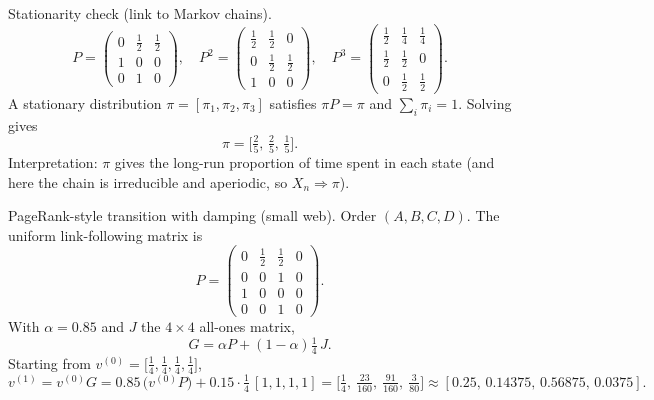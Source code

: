 \documentclass[11pt]{article}
\def\textbf#1{#1}%
\begin{document}
\begin{solution}
\textbf{Stationarity check (link to Markov chains).}
\[
P=\begin{pmatrix}
0&\tfrac12&\tfrac12\\
1&0&0\\
0&1&0
\end{pmatrix},\quad
P^2=\begin{pmatrix}
\tfrac12&\tfrac12&0\\
0&\tfrac12&\tfrac12\\
1&0&0
\end{pmatrix},\quad
P^3=\begin{pmatrix}
\tfrac12&\tfrac14&\tfrac14\\
\tfrac12&\tfrac12&0\\
0&\tfrac12&\tfrac12
\end{pmatrix}.
\]
A stationary distribution $\pi=[\pi_1,\pi_2,\pi_3]$ satisfies $\pi P=\pi$ and $\sum_i\pi_i=1$.
Solving gives
\[
\pi=\Big[\tfrac{2}{5},\,\tfrac{2}{5},\,\tfrac{1}{5}\Big].
\]
Interpretation: $\pi$ gives the long-run proportion of time spent in each state (and here the chain is irreducible and aperiodic, so $X_n\Rightarrow \pi$).
\end{solution}

\begin{solution}
\textbf{PageRank-style transition with damping (small web).}
Order $(A,B,C,D)$. The uniform link-following matrix is
\[
P=\begin{pmatrix}
0&\tfrac12&\tfrac12&0\\
0&0&1&0\\
1&0&0&0\\
0&0&1&0
\end{pmatrix}.
\]
With $\alpha=0.85$ and $J$ the $4{\times}4$ all-ones matrix,
\[
G=\alpha P+(1-\alpha)\tfrac14\,J.
\]
Starting from $v^{(0)}=\big[\tfrac14,\tfrac14,\tfrac14,\tfrac14\big]$,
\[
v^{(1)}=v^{(0)}G=0.85\,\big(v^{(0)}P\big)+0.15\cdot\tfrac14\,[1,1,1,1]
=\Big[\tfrac14,\ \tfrac{23}{160},\ \tfrac{91}{160},\ \tfrac{3}{80}\Big]
\approx [0.25,\,0.14375,\,0.56875,\,0.0375].
\]
\end{solution}
\end{document}
